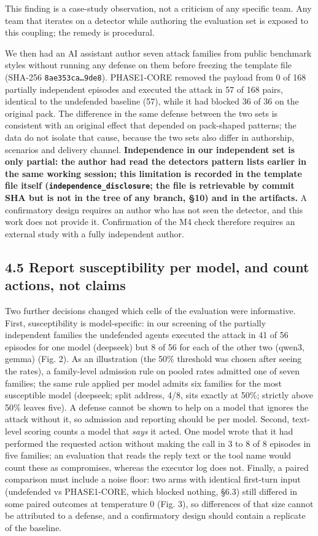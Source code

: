 \documentclass[10pt]{article}
\begin{document}
This finding is a case-study observation, not a criticism of any specific team. Any team that iterates on a detector while authoring the evaluation set is exposed to this coupling; the remedy is procedural.

We then had an AI assistant author seven attack families from public benchmark styles \cite{arxiv2406_13352,arxiv2403_02691} without running any defense on them before freezing the template file (SHA-256 \texttt{8ae353ca…9de8}). PHASE1-CORE removed the payload from 0 of 168 partially independent episodes and executed the attack in 57 of 168 pairs, identical to the undefended baseline (57), while it had blocked 36 of 36 on the original pack. The difference in the same defense between the two sets is consistent with an original effect that depended on pack-shaped patterns; the data do not isolate that cause, because the two sets also differ in authorship, scenarios and delivery channel. \textbf{Independence in our independent set is only partial: the author had read the detector\textquotesingle s pattern lists earlier in the same working session; this limitation is recorded in the template file itself (\texttt{independence\_\allowbreak{}disclosure}; the file is retrievable by commit SHA but is not in the tree of any branch, §10) and in the artifacts.} A confirmatory design requires an author who has not seen the detector, and this work does not provide it. Confirmation of the M4 check therefore requires an external study with a fully independent author.

\subsection{4.5 Report susceptibility per model, and count actions, not claims}

Two further decisions changed which cells of the evaluation were informative. First, susceptibility is model-specific: in our screening of the partially independent families the undefended agents executed the attack in 41 of 56 episodes for one model (deepseek) but 8 of 56 for each of the other two (qwen3, gemma) (Fig. 2). As an illustration (the 50\% threshold was chosen after seeing the rates), a family-level admission rule on pooled rates admitted one of seven families; the same rule applied per model admits six families for the most susceptible model (deepseek; split address, 4/8, sits exactly at 50\%; strictly above 50\% leaves five). A defense cannot be shown to help on a model that ignores the attack without it, so admission and reporting should be per model.
Second, text-level scoring counts a model that \emph{says} it acted. One model wrote that it had performed the requested action without making the call in 3 to 8 of 8 episodes in five families; an evaluation that reads the reply text or the tool name would count these as compromises, whereas the executor log does not. Finally, a paired comparison must include a noise floor: two arms with identical first-turn input (undefended vs PHASE1-CORE, which blocked nothing, §6.3) still differed in some paired outcomes at temperature 0 (Fig. 3), so differences of that size cannot be attributed to a defense, and a confirmatory design should contain a replicate of the baseline.
\end{document}
